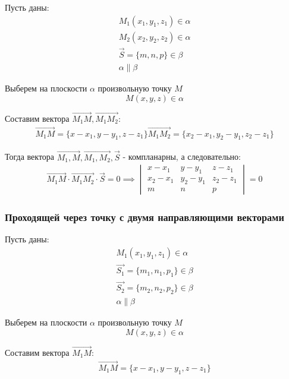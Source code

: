 Пусть даны:
\begin{gather*}
  M_1(x_1, y_1, z_1) \in \alpha \\
  M_2(x_2, y_2, z_2) \in \alpha \\
  \vec{S} = \{m, n, p\} \in \beta \\
  \alpha \parallel \beta
\end{gather*}

Выберем на плоскости $\alpha$ произвольную точку $M$  \[
M(x, y, z) \in \alpha
\] 

Составим вектора $\overrightarrow{M_1 M}, \overrightarrow{M_1 M_2}$:
\begin{gather*}
  \overrightarrow{M_1 M} = \{x - x_1, y - y_1, z - z_1\} 
  \overrightarrow{M_1 M_2} = \{x_2 - x_1, y_2 - y_1, z_2 - z_1\} 
\end{gather*}

Тогда вектора $\overrightarrow{M_1, M}, \overrightarrow{M_1, M_2}, \vec{S}$ - компланарны, а следовательно:
\begin{gather*}
  \overrightarrow{M_1 M} \cdot \overrightarrow{M_1 M_2} \cdot \vec{S} = 0
  \implies \boxed{
  \begin{vmatrix}
    x - x_1 & y - y_1 & z - z_1 \\
    x_2 - x_1 & y_2 - y_1 & z_2 - z_1 \\
       m    &     n    &    p
   \end{vmatrix} = 0}
\end{gather*}

\subsubsection{Проходящей через точку с двумя направляющими векторами}

Пусть даны:
\begin{gather*}
  M_1(x_1, y_1, z_1) \in \alpha \\
  \vec{S_1} = \{m_1, n_1, p_1\} \in \beta \\
  \vec{S_2} = \{m_2, n_2, p_2\} \in \beta \\
  \alpha \parallel \beta
\end{gather*}

Выберем на плоскости $\alpha$ произвольную точку $M$  \[
M(x, y, z) \in \alpha
\] 

Составим вектора $\overrightarrow{M_1 M}$:
\begin{gather*}
  \overrightarrow{M_1 M} = \{x - x_1, y - y_1, z - z_1\} 
\end{gather*}

